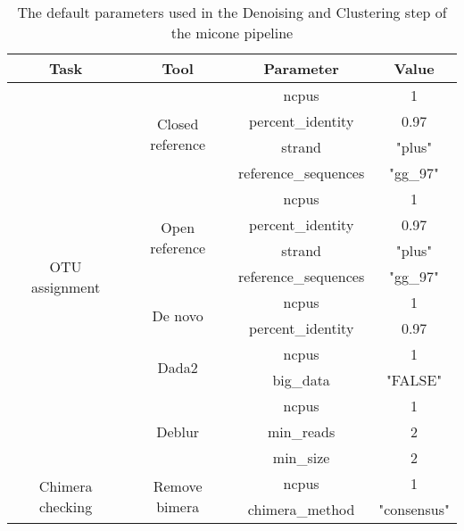 \begin{table}[H]
\centering
\small
\begin{tabular}{|c|c|c|c|}
\hline
\textbf{Task}                     & \textbf{Tool}                     & \textbf{Parameter}   & \textbf{Value}       \\ \hline
\multirow{15}{*}{OTU assignment}  & \multirow{4}{*}{Closed reference} & ncpus                & 1                    \\
                                  &                                   & percent\_identity    & 0.97                 \\
                                  &                                   & strand               & "plus"               \\
                                  &                                   & reference\_sequences & "gg\_97" \\ \cline{2-4}
                                  & \multirow{4}{*}{Open reference}   & ncpus                & 1                    \\
                                  &                                   & percent\_identity    & 0.97                 \\
                                  &                                   & strand               & "plus"               \\
                                  &                                   & reference\_sequences & "gg\_97" \\ \cline{2-4}
                                  & \multirow{2}{*}{De novo}          & ncpus                & 1                    \\
                                  &                                   & percent\_identity    & 0.97                 \\ \cline{2-4}
                                  & \multirow{2}{*}{Dada2}            & ncpus                & 1                    \\
                                  &                                   & big\_data            & "FALSE"              \\ \cline{2-4}
                                  & \multirow{3}{*}{Deblur}           & ncpus                & 1                    \\
                                  &                                   & min\_reads           & 2                    \\
                                  &                                   & min\_size            & 2                    \\ \hline
\multirow{2}{*}{Chimera checking} & \multirow{2}{*}{Remove bimera}    & ncpus                & 1                    \\
                                  &                                   & chimera\_method      & "consensus"          \\ \hline
\end{tabular}
\caption{The default parameters used in the Denoising and Clustering step of the \ac{micone} pipeline}
\label{tab:dc_parameters}
\end{table}

